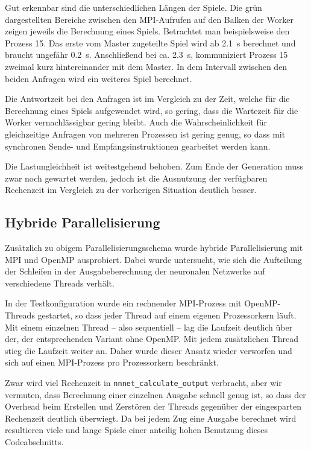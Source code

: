 Gut erkennbar sind die unterschiedlichen Längen der Spiele. Die grün
dargestellten Bereiche zwischen den MPI-Aufrufen auf den Balken der Worker
zeigen jeweils die Berechnung eines Spiels. Betrachtet man beispielsweise den
Prozess 15. Das erste vom Master zugeteilte Spiel wird ab \SI{2,1}{\second}
berechnet und braucht ungefähr \SI{0,2}{\second}. Anschließend bei ca.
\SI{2,3}{\second}, kommuniziert Prozess 15 zweimal kurz hintereinander mit dem
Master. In dem Intervall zwischen den beiden Anfragen wird ein weiteres Spiel
berechnet.

Die Antwortzeit bei den Anfragen ist im Vergleich zu der Zeit, welche für die
Berechnung eines Spiels aufgewendet wird, so gering, dass die Wartezeit für die
Worker vernachlässigbar gering bleibt. Auch die Wahrscheinlichkeit für
gleichzeitige Anfragen von mehreren Prozessen ist gering genug, so dass mit
synchronen Sende- und Empfangsinstruktionen gearbeitet werden kann.

Die Lastungleichheit ist weitestgehend behoben. Zum Ende der Generation muss
zwar noch gewartet werden, jedoch ist die Ausnutzung der verfügbaren Rechenzeit
im Vergleich zu der vorherigen Situation deutlich besser.

\subsection{Hybride Parallelisierung}
Zusätzlich zu obigem Parallelisierungsschema wurde hybride Parallelisierung mit
MPI und OpenMP ausprobiert.  Dabei wurde untersucht, wie sich die Aufteilung
der Schleifen in der Ausgabeberechnung der neuronalen Netzwerke auf
verschiedene Threads verhält.

In der Testkonfiguration wurde ein rechnender MPI-Prozess mit OpenMP-Threads
gestartet, so dass jeder Thread auf einem eigenen Prozessorkern läuft.  Mit
einem einzelnen Thread -- also sequentiell -- lag die Laufzeit deutlich über
der, der entsprechenden Variant ohne OpenMP.  Mit jedem zusätzlichen Thread
stieg die Laufzeit weiter an. Daher wurde dieser Ansatz wieder verworfen und
sich auf einen MPI-Prozess pro Prozessorkern beschränkt.

Zwar wird viel Rechenzeit in \texttt{nnnet\_calculate\_output} verbracht, aber
wir vermuten, dass Berechnung einer einzelnen Ausgabe schnell genug ist, so
dass der Overhead beim Erstellen und Zerstören der Threads gegenüber der
eingesparten Rechenzeit deutlich überwiegt. Da bei jedem Zug eine Ausgabe
berechnet wird resultieren viele und lange Spiele einer anteilig hohen
Benutzung dieses Codeabschnitts.

